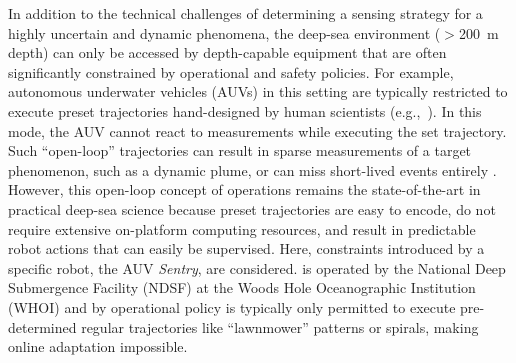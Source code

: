 In addition to the technical challenges of determining a sensing strategy for a highly uncertain and dynamic phenomena, the deep-sea environment ($>$\SI{200}{\meter} depth) can only be accessed by depth-capable equipment that are often significantly constrained by operational and safety policies. For example, autonomous underwater vehicles (AUVs) in this setting are typically restricted to execute preset trajectories hand-designed by human scientists (e.g.,~\cite{camilli2010tracking}). In this mode, the AUV cannot react to measurements while executing the set trajectory. Such ``open-loop'' trajectories can result in sparse measurements of a target phenomenon, such as a dynamic plume, or can miss short-lived events entirely \autocite{flaspohler2019information, preston2019adaptive}. However, this open-loop concept of operations remains the state-of-the-art in practical deep-sea science because preset trajectories are easy to encode, do not require extensive on-platform computing resources, and result in predictable robot actions that can easily be supervised. Here, constraints introduced by a specific robot, the AUV \emph{Sentry}, are considered. \Sentry is operated by the National Deep Submergence Facility (NDSF) at the Woods Hole Oceanographic Institution (WHOI) \autocite{kaiser2016design} and by operational policy is typically only permitted to execute pre-determined regular trajectories like ``lawnmower'' patterns or spirals, making online adaptation impossible. %

